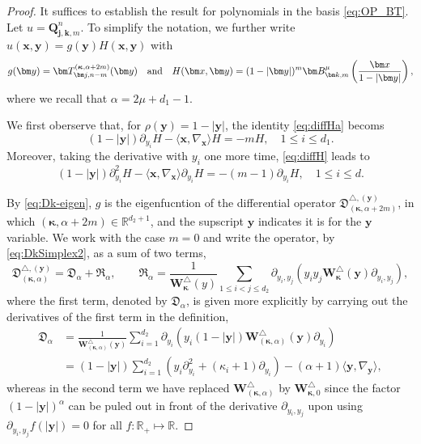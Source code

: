 \documentclass{amsart}
\theoremstyle{remark}
\def\la{{\langle}}
\def\ra{{\rangle}}
\def\fD{{\mathfrak D}}
\def\fR{{\mathfrak R}}
\def\a{{\alpha}}
\def\k{{\kappa}}
\def\la{{\langle}}
\def\ra{{\rangle}}
\def\yb{{\bm y}}
\def\RR{{\mathbb R}}
\def\bk{{\boldsymbol{\kappa}}}
\begin{document}
\begin{proof}
It suffices to establish the result for polynomials in the basis \eqref{eq:OP_BT}. Let $u =\bm Q_{\bm j, \bm k, m}^n$. 
To simplify the notation, we further write $u(\bm x,\bm y) = g(\bm y) H(\bm x,\bm y)$ with 
$$
g(\bm y) = \bm T_{\bm j, n-m}^{(\bk, \alpha +2m)}(\bm y) \quad \hbox{and}\quad
  H(\bm x, \bm y) =   (1-|\bm y|)^m \bm B_{\bm k, m}^\mu \left(\frac{\bm x}{1-|\bm y|}\right),
$$
where we recall that $\a = 2\mu + d_1-1$. 

We first oberserve that, for $\rho(\yb) = 1-|\yb|$, the identity \eqref{eq:diffHa} becoms
\begin{equation} \label{eq:diffH}
     (1-|\bm y|) \partial_{y_i} H - \la \bm x, \nabla_{\bm x}\ra  H  = -m  H,\quad 1 \le i \le d_1.
\end{equation} 
Moreover, taking the derivative with $y_i$ one more time, \eqref{eq:diffH} leads to 
\begin{equation} \label{eq:diffH2}
     (1-|\bm y|) \partial_{y_i}^2 H - \la \bm x, \nabla_{\bm x}\ra \partial_{y_i} H  = -(m-1) \partial_{y_i} H ,
       \quad 1 \le i \le d. 
\end{equation}

By \eqref{eq:Dk-eigen}, $g$ is the eigenfucntion of the differential operator $\fD_{(\bk, \a+2m)}^{\triangle, (\yb)}$, in which 
$(\bk, \a+2m) \in \RR^{d_2+1}$, and the supscript $\yb$ indicates it is for the $\yb$ variable. We work with the case 
$m =0$ and write the operator, by \eqref{eq:DkSimplex2}, as a sum of two terms, 
\begin{equation} \label{eq:fD+}
\fD_{(\bk, \a)}^{\triangle, (\yb)} = \fD_{\a} + \fR_{\a}, \qquad \fR_\a = \frac1{\bm W_{\bk}^\triangle(y)} \sum_{1\le i < j \le d_2} \partial_{y_i, y_j} 
  \left(y_i y_j \bm W_{\bk}^\triangle(\bm y)  \partial_{y_i, y_j} \right),
\end{equation}
where the first term, denoted by $\fD_\a$, is given more explicitly by carrying out the derivatives of the first term in the definition,   
\begin{align*}
 \fD_{\a} & = 
 \frac{1}{\bm W_{(\bk,\a)}^\triangle(\bm y)} 
   \sum_{i=1}^{d_2} \partial_{y_i} \left( y_i (1-|\bm y|) \bm W_{(\bk,\a)}^\triangle(\bm y) \partial_{y_i}\right) \\ 
 & = (1-|\bm y |)  \sum_{i=1}^{d_2} \left(y_i \partial_{y_i}^2 + (\k_i +1) \partial_{y_i} \right)  - (\a +1) 
     \la \bm y, \nabla_{\bm y} \ra,
\end{align*}
whereas in the second  term we have replaced $\bm W_{(\bk,\a)}^\triangle$ by $\bm W_{\bk,0}^\triangle$ since the
factor $(1-|\bm y|)^{\a}$ can be puled out in front of the derivative $\partial_{y_i, y_j}$ upon using $\partial_{y_i, y_j} f(|\bm y|) = 0$
for all $f: \RR_+ \mapsto \RR$.  


\end{proof}
\end{document}
